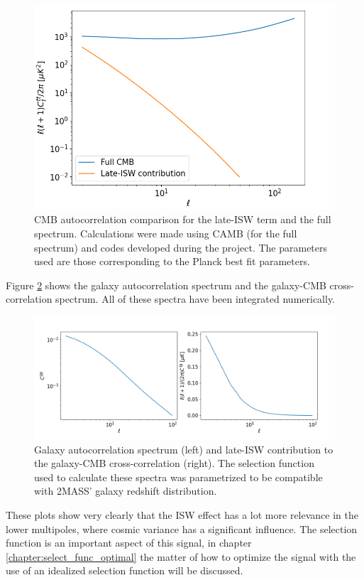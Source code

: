 \documentclass[openany,a4paper,12pt,oneside]{book}
\begin{document}
\begin{spacing}{1.5}
\begin{figure}[!htb]
    \centering
    \includegraphics[width=.75\linewidth]{Imagens/Ctt_comparison.png}
	\caption{CMB autocorrelation comparison for the late-ISW term and the full spectrum. Calculations were made using CAMB (for the full spectrum) and codes developed during the project. The parameters used are those corresponding to the Planck best fit parameters\cite{Planck_results}.}
    \label{fig:Ctt_ISW_comparison}
\end{figure}

Figure \ref{fig:correlations_theoretical} shows the galaxy autocorrelation spectrum and the galaxy-CMB cross-correlation spectrum. All of these spectra have been integrated numerically.

\begin{figure}[!htb]
	\centering
	\includegraphics[width=.98\linewidth]{Imagens/Correlations_DoublePlot.png}
	\caption{Galaxy autocorrelation spectrum (left) and late-ISW contribution to the galaxy-CMB cross-correlation (right). The selection function used to calculate these spectra was parametrized to be compatible with 2MASS' galaxy redshift distribution\cite{cross_corr:Afshordi, Moura-Santos_2016}.}
	\label{fig:correlations_theoretical}
\end{figure}

These plots show very clearly that the ISW effect has a lot more relevance in the lower multipoles, where cosmic variance has a significant influence. The selection function is an important aspect of this signal, in chapter \ref{chapter:select_func_optimal} the matter of how to optimize the signal with the use of an idealized selection function will be discussed.


\end{spacing}
\end{document}
